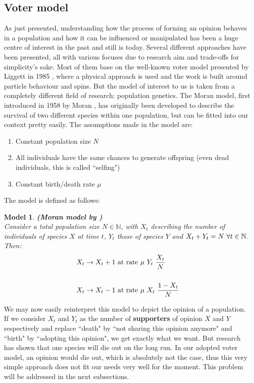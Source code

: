\documentclass[12pt,a4paper,twoside]{article}
\newtheorem{model}{Model}[section]
\begin{document}
\subsection{Voter model}
As just presented, understanding how the process of forming an opinion behaves in a population and how it can be influenced or manipulated has been a huge centre of interest in the past and still is today. Several different approaches have been presented, all with various focuses due to research aim and trade-offs for simplicity's sake. Most of them base on the well-known voter model presented by Liggett in 1985 \cite{Liggett1985}, where a physical approach is used and the work is built around particle behaviour and spins. But the model of interest to us is taken from a completely different field of research: population genetics. The Moran model, first introduced in 1958 by Moran \cite{Moran1958}, has originally been developed to describe the survival of two different species within one population, but can be fitted into our context pretty easily. The assumptions made in the model are:
\begin{enumerate}
	\item Constant population size $N$
	\item All individuals have the same chances to generate offspring (even dead individuals, this is called ``selfing")
	\item Constant birth/death rate $\mu$
\end{enumerate}
The model is defined as follows:
\begin{model}\textbf{(Moran model by \cite{Moran1958, Muller2015})}\label{model:moran}\\
	Consider a total population size $N \in \mathbb{N}$, with $X_t$ describing the number of individuals of species $X$ at time $t$, $Y_t$ those of species $Y$ and $X_t + Y_t = N \textnormal{  }\forall t \in \mathbb{N}$. Then:
	\begin{align}
	\begin{split}
		X_t \rightarrow X_t + 1 &\textnormal{ at rate } \mu\textnormal{ }Y_t\textnormal{ }\frac{X_t}{N}\\
		&\\
		X_t \rightarrow X_t - 1 &\textnormal{ at rate } \mu\textnormal{ }X_t\textnormal{ }\frac{1 - X_t}{N}
	\end{split}
	\end{align}
\end{model}
We may now easily reinterpret this model to depict the opinion of a population. If we consider $X_t$ and $Y_t$ as the number of \textbf{supporters} of opinion $X$ and $Y$ respectively and replace ``death" by ``not sharing this opinion anymore" and ``birth" by ``adopting this opinion", we get exactly what we want. But research has shown that one species will die out on the long run. In our adopted voter model, an opinion would die out, which is absolutely not the case, thus this very simple approach does not fit our needs very well for the moment. This problem will be addressed in the next subsections.
\end{document}
